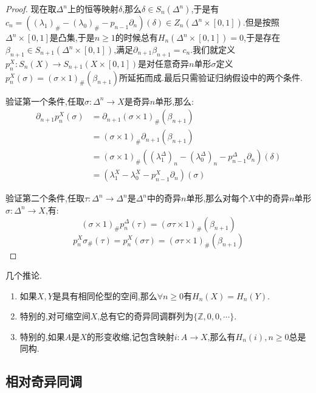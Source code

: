 \begin{proof}
	现在取$\Delta^n$上的恒等映射$\delta$,那么$\delta\in S_n(\Delta^n)$,于是有$c_n=((\lambda_1)_{\#}-(\lambda_0)_{\#}-p_{n-1}\partial_n)(\delta)\in Z_n(\Delta^n\times[0,1])$.但是按照$\Delta^n\times[0,1]$是凸集,于是$n\ge1$的时候总有$H_n(\Delta^n\times[0,1])=0$,于是存在$\beta_{n+1}\in S_{n+1}(\Delta^n\times[0,1])$,满足$\partial_{n+1}\beta_{n+1}=c_n$.我们就定义$p_n^X:S_n(X)\to S_{n+1}(X\times[0,1])$是对任意奇异$n$单形$\sigma$定义$p_n^X(\sigma)=(\sigma\times1)_{\#}(\beta_{n+1})$所延拓而成.最后只需验证归纳假设中的两个条件.
	
	验证第一个条件,任取$\sigma:\Delta^n\to X$是奇异$n$单形,那么:
	\begin{align*}
	\partial_{n+1}p_n^X(\sigma)&=\partial_{n+1}(\sigma\times1)_{\#}(\beta_{n+1})\\&=(\sigma\times1)_{\#}\partial_{n+1}(\beta_{n+1})\\&=(\sigma\times1)_{\#}\left((\lambda_1^{\Delta})_n-(\lambda_0^{\Delta})_n-p_{n-1}^{\Delta}\partial_n\right)(\delta)\\&=\left(\lambda_1^X-\lambda_0^X-p_{n-1}^X\partial_n\right)(\sigma)
	\end{align*}
	
	验证第二个条件,任取$\tau:\Delta^n\to\Delta^n$是$\Delta^n$中的奇异$n$单形,那么对每个$X$中的奇异$n$单形$\sigma:\Delta^n\to X$,有:
	$$(\sigma\times1)_{\#}p_n^{\Delta}(\tau)=(\sigma\tau\times1)_{\#}(\beta_{n+1})$$
	$$p_n^X\sigma_{\#}(\tau)=p_n^X(\sigma\tau)=(\sigma\tau\times1)_{\#}(\beta_{n+1})$$
\end{proof}

几个推论.
\begin{enumerate}
	\item 如果$X,Y$是具有相同伦型的空间,那么$\forall n\ge0$有$H_n(X)=H_n(Y)$.
	\item 特别的,对可缩空间$X$,总有它的奇异同调群列为$\{\mathbb{Z},0,0,\cdots\}$.
	\item 特别的,如果$A$是$X$的形变收缩,记包含映射$i:A\to X$,那么有$H_n(i),n\ge0$总是同构.
\end{enumerate}
\newpage
\subsection{相对奇异同调}

